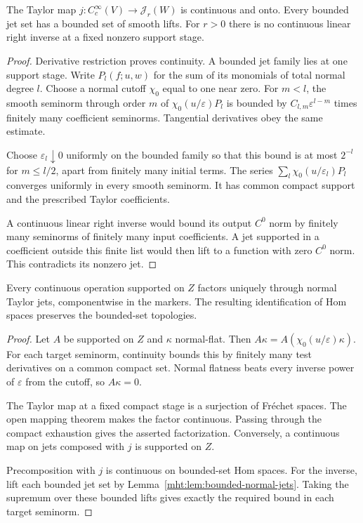 \begin{lemma}\label{mht:lem:bounded-normal-jets}
The Taylor map $j:C_c^\infty(V)\to\mathcal J_r(W)$ is
continuous and onto. Every bounded jet set has a bounded
set of smooth lifts. For $r>0$ there is no continuous
linear right inverse at a fixed nonzero support stage.
\end{lemma}
\begin{proof}
Derivative restriction proves continuity. A bounded jet
family lies at one support stage. Write $P_l(f;u,w)$
for the sum of its monomials of total normal degree $l$.
Choose a normal cutoff $\chi_0$ equal to one near zero.
For $m<l$, the smooth seminorm through order $m$ of
$\chi_0(u/\varepsilon)P_l$ is bounded by
$C_{l,m}\varepsilon^{l-m}$ times finitely many coefficient
seminorms. Tangential derivatives obey the same estimate.

Choose $\varepsilon_l\downarrow0$ uniformly on the bounded
family so that this bound is at most $2^{-l}$ for
$m\leq l/2$, apart from finitely many initial terms.
The series $\sum_l\chi_0(u/\varepsilon_l)P_l$ converges
uniformly in every smooth seminorm. It has common compact
support and the prescribed Taylor coefficients.

A continuous linear right inverse would bound its output
$C^0$ norm by finitely many seminorms of finitely many
input coefficients. A jet supported in a coefficient
outside this finite list would then lift to a function
with zero $C^0$ norm. This contradicts its nonzero jet.
\end{proof}

\begin{lemma}\label{mht:lem:supported-jet-factorization}
Every continuous operation supported on $Z$ factors uniquely
through normal Taylor jets, componentwise in the markers.
The resulting identification of Hom spaces preserves the
bounded-set topologies.
\end{lemma}
\begin{proof}
Let $A$ be supported on $Z$ and $\kappa$ normal-flat.
Then $A\kappa=A(\chi_0(u/\varepsilon)\kappa)$.
For each target seminorm, continuity bounds this by
finitely many test derivatives on a common compact set.
Normal flatness beats every inverse power of $\varepsilon$
from the cutoff, so $A\kappa=0$.

The Taylor map at a fixed compact stage is a surjection
of Fr\'echet spaces. The open mapping theorem makes the
factor continuous. Passing through the compact exhaustion
gives the asserted factorization. Conversely, a continuous
map on jets composed with $j$ is supported on $Z$.

Precomposition with $j$ is continuous on bounded-set Hom
spaces. For the inverse, lift each bounded jet set by
Lemma~\ref{mht:lem:bounded-normal-jets}. Taking the supremum
over these bounded lifts gives exactly the required bound
in each target seminorm.
\end{proof}

